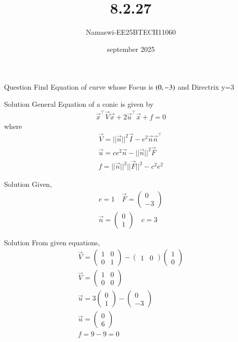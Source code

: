 \documentclass{beamer}
\begin{document}
\title 
{8.2.27}
\date{september 2025}


\author 
{Namaswi-EE25BTECH11060}
\frame{\titlepage}
\begin{frame}{Question}
Find Equation of curve whose Focus is $\left(0,-3\right)$ and Directrix y=3
\end{frame}
\begin{frame}{Solution}
 General Equation of a conic is given by\\
\begin{align}
\Vec{x}^\top \Vec{V} \Vec{x} +2 \Vec{u}^\top \Vec{x}+f=0
\end{align}
where
\begin{align}
\Vec{V}=||\Vec{n}||^2 \Vec{I} -e^2  \Vec{n} \Vec{n} ^\top \\
\Vec{u}=ce^2\Vec{n}-||\Vec{n}||^2 \Vec{F}\\
f=||\Vec{n}||^2 ||\Vec{F}||^2 -c^2 e^2
\end{align}  
\end{frame}
\begin{frame}{Solution}
    Given,
\begin{align*}
    e=1  \quad 
    \Vec{F}=\begin{pmatrix}
        0 \\ -3
    \end{pmatrix}\\
    \Vec{n}=\begin{pmatrix}
        0 \\ 1
    \end{pmatrix}  \quad 
    c = 3
\end{align*}
\end{frame}
\begin{frame}{Solution}
    From given equations,
\begin{align}
    \Vec{V}=\begin{pmatrix}
        1 & 0  \\
        0 & 1
    \end{pmatrix}-\begin{pmatrix}
        1 & 0
    \end{pmatrix}\begin{pmatrix}
        1 \\  0
    \end{pmatrix}\\
   \Vec{V} =\begin{pmatrix}
        1  & 0 \\ 0 & 0
    \end{pmatrix}\\
    \Vec{u}=3 \begin{pmatrix}
        0 \\ 1
    \end{pmatrix}-\begin{pmatrix}
        0  \\ -3
    \end{pmatrix}\\
   \Vec{u} =\begin{pmatrix}
        0 \\ 6
    \end{pmatrix}\\
    f=9-9 =0 
\end{align}
\end{frame}
\end{document}
